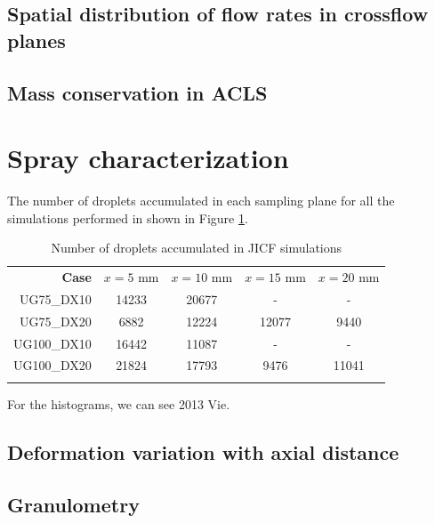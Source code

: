 \subsection{Spatial distribution of flow rates in crossflow planes}




\newpage

\subsection{Mass conservation in ACLS}


\newpage

\section{Spray characterization}

The number of droplets accumulated in each sampling plane for all the simulations performed in shown in Figure \ref{tab:jicf_Ndr_accumulated}.

\begin{table}[!h]
\centering
\caption{Number of droplets accumulated in JICF simulations}
\begin{tabular}{rcccc}
\thickhline
\textbf{Case} & $x = 5$ mm & $x = 10$ mm & $x = 15$ mm  & $x = 20$ mm \\
\thickhline 
UG75\_DX10  & 14233 & 20677 & - & - \\
UG75\_DX20  &  6882 & 12224 & 12077 & 9440 \\
UG100\_DX10 & 16442 & 11087 & - & -\\
UG100\_DX20 & 21824 & 17793 & 9476 & 11041 \\
\thickhline
\end{tabular}
\label{tab:jicf_Ndr_accumulated}
\end{table}

For the histograms, we can see 2013 Vie.


\subsection{Deformation variation with axial distance}

\subsection{Granulometry}

